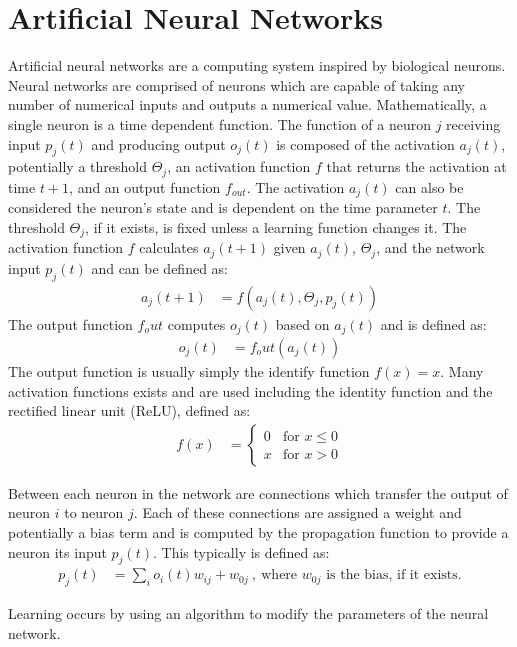 \section{Artificial Neural Networks}
Artificial neural networks are a computing system inspired by biological neurons. Neural networks are comprised of neurons which are capable of taking any number of numerical inputs and outputs a numerical value. Mathematically, a single neuron is a time dependent function.
The function of a neuron $j$ receiving input $p_j(t)$ and producing output $o_j(t)$ is composed of the activation $a_j(t)$, potentially a threshold $\Theta_j$, an activation function $f$ that returns the activation at time $t + 1$, and an output function $f_{out}$.
The activation $a_j(t)$ can also be considered the neuron's state and is dependent on the time parameter $t$.
The threshold $\Theta_j$, if it exists, is fixed unless a learning function changes it.
The activation function $f$ calculates $a_j(t + 1)$ given $a_j(t)$, $\Theta_j$, and the network input $p_j(t)$ and can be defined as:
\begin{align}
	a_j(t + 1) &= f\left(a_j(t), \Theta_j, p_j(t)\right)
\end{align}
The output function $f_out$ computes $o_j(t)$ based on $a_j(t)$ and is defined as:
\begin{align}
	o_j(t) &= f_out\left(a_j(t)\right)
\end{align}
The output function is usually simply the identify function $f(x) = x$.
Many activation functions exists and are used including the identity function and the rectified linear unit (ReLU), defined as:
\begin{align}
	f(x) &= 
	\begin{cases}
		0	& \text{for } x \leq 0\\
		x	& \text{for } x > 0
	\end{cases}
\end{align}

Between each neuron in the network are connections which transfer the output of neuron $i$ to neuron $j$. Each of these connections are assigned a weight and potentially a bias term and is computed by the propagation function to provide a neuron its input $p_j(t)$. This typically is defined as:
\begin{align}
	p_j(t) &= \sum_{i}o_i(t)w_{ij} + w_{0j}~,~\text{where } w_{0j} \text{ is the bias, if it exists.}
\end{align}

Learning occurs by using an algorithm to modify the parameters of the neural network.

